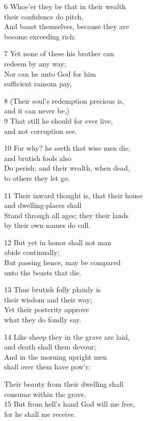 \begin{multicols}{3}
6 Whoe’er they be that in their wealth\\
their confidence do pitch,\\
And boast themselves, because they are\\
become exceeding rich:

7 Yet none of these his brother can\\
redeem by any way;\\
Nor can he unto God for him\\
sufficient ransom pay,

8 (Their soul’s redemption precious is,\\
and it can never be,)\\
9 That still he should for ever live,\\
and not corruption see.

10 For why? he seeth that wise men die,\\
and brutish fools also\\
Do perish; and their wealth, when dead,\\
to others they let go.

11 Their inward thought is, that their house\\
and dwelling-places shall\\
Stand through all ages; they their lands\\
by their own names do call.

12 But yet in honor shall not man\\
abide continually;\\
But passing hence, may be compared\\
unto the beasts that die.

13 Thus brutish folly plainly is\\
their wisdom and their way;\\
Yet their posterity approve\\
what they do fondly say.

14 Like sheep they in the grave are laid,\\
and death shall them devour;\\
And in the morning upright men\\
shall over them have pow’r:

Their beauty from their dwelling shall\\
consume within the grave.\\
15 But from hell’s hand God will me free,\\
for he shall me receive.


\end{multicols}

